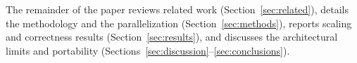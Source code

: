 The remainder of the paper reviews related work (Section~\ref{sec:related}), details the
methodology and the parallelization (Section~\ref{sec:methods}), reports scaling and
correctness results (Section~\ref{sec:results}), and discusses the architectural limits and
portability (Sections~\ref{sec:discussion}--\ref{sec:conclusions}).
